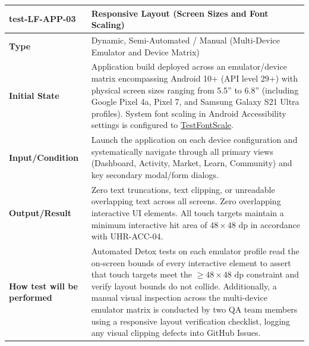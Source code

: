 \documentclass[12pt, titlepage]{article}
\newcommand{\const}[1]{\hyperlink{const:#1}{\textsf{#1}}}
\begin{document}
\noindent\begin{tabularx}{\textwidth}{>{\raggedright\arraybackslash}p{3.5cm}X}
  \toprule
  \textbf{test-LF-APP-03}\label{test:LF-APP-03} & \textbf{Responsive Layout (Screen Sizes and Font Scaling)}\\
  \midrule
  \textbf{Type} & Dynamic, Semi-Automated / Manual (Multi-Device Emulator and Device Matrix)\\
  \textbf{Initial State} & Application build deployed across an emulator/device matrix encompassing Android 10+ (API level 29+) with physical screen sizes ranging from 5.5'' to 6.8'' (including Google Pixel 4a, Pixel 7, and Samsung Galaxy S21 Ultra profiles). System font scaling in Android Accessibility settings is configured to \const{TestFontScale}.\\
  \textbf{Input/Condition} & Launch the application on each device configuration and systematically navigate through all primary views (Dashboard, Activity, Market, Learn, Community) and key secondary modal/form dialogs.\\
  \textbf{Output/Result} & Zero text truncations, text clipping, or unreadable overlapping text across all screens. Zero overlapping interactive UI elements. All touch targets maintain a minimum interactive hit area of $48 \times 48\text{ dp}$ in accordance with UHR-ACC-04.\\
  \textbf{How test will be performed} & Automated Detox tests on each emulator profile read the on-screen bounds of every interactive element to assert that touch targets meet the $\ge 48 \times 48\text{ dp}$ constraint and verify layout bounds do not collide. Additionally, a manual visual inspection across the multi-device emulator matrix is conducted by two QA team members using a responsive layout verification checklist, logging any visual clipping defects into GitHub Issues.\\
  \bottomrule
\end{tabularx}

\vspace{1em}
\end{document}
